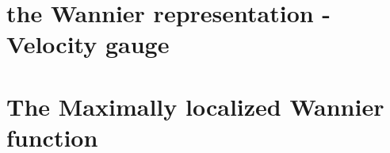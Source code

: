 \documentclass[aps,prb,preprint]{revtex4-1}
\begin{document}
\begin{appendix}
\section{the Wannier representation -Velocity gauge }\cite{Iafrate} 
\label{sec:WV}



\section{The Maximally localized Wannier function}
\fi
\end{appendix}




\end{document}
